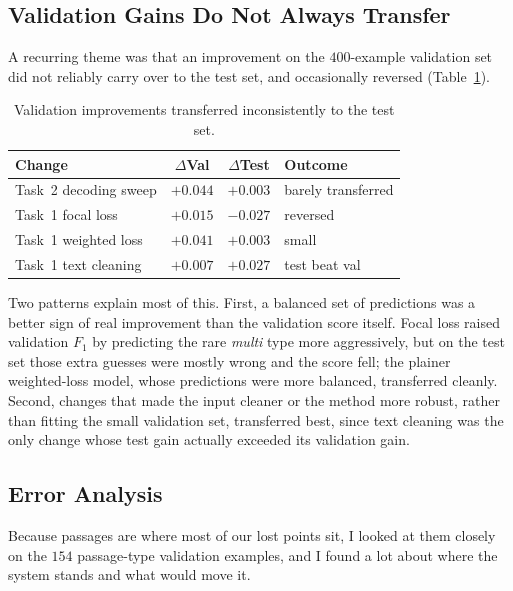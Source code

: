 \documentclass[11pt]{article}
\begin{document}
\subsection{Validation Gains Do Not Always Transfer}
\label{sec:transfer}
A recurring theme was that an improvement on the $400$-example validation set did
not reliably carry over to the test set, and occasionally reversed
(Table~\ref{tab:transfer}).

\begin{table}[t]
\centering\footnotesize
\setlength{\tabcolsep}{1pt}
\begin{tabular}{@{}lccl@{}}
\toprule
Change & $\Delta$Val & $\Delta$Test & Outcome \\
\midrule
Task~2 decoding sweep & $+0.044$ & $+0.003$ & barely transferred \\
Task~1 focal loss & $+0.015$ & $-0.027$ & reversed \\
Task~1 weighted loss & $+0.041$ & $+0.003$ & small \\
Task~1 text cleaning & $+0.007$ & $\mathbf{+0.027}$ & test beat val \\
\bottomrule
\end{tabular}
\caption{Validation improvements transferred inconsistently to the test set.}
\label{tab:transfer}
\end{table}

Two patterns explain most of this. First, a balanced set of predictions was a
better sign of real improvement than the validation score itself. Focal loss
raised validation $F_1$ by predicting the rare \textit{multi} type more
aggressively, but on the test set those extra guesses were mostly wrong and the
score fell; the plainer weighted-loss model, whose predictions were more balanced,
transferred cleanly. Second, changes that made the input cleaner or the method
more robust, rather than fitting the small validation set, transferred best, since text
cleaning was the only change whose test gain actually exceeded its validation gain.

\subsection{Error Analysis}
\label{sec:error}
Because passages are where most of our lost points sit, I looked at them closely
on the $154$ passage-type validation examples, and I found a lot about where the system stands and what would move it.
\end{document}
